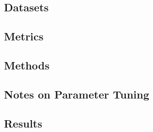 \subsection{Datasets}


\subsection{Metrics}

\subsection{Methods}

\subsection{Notes on Parameter Tuning}

\subsection{Results}
